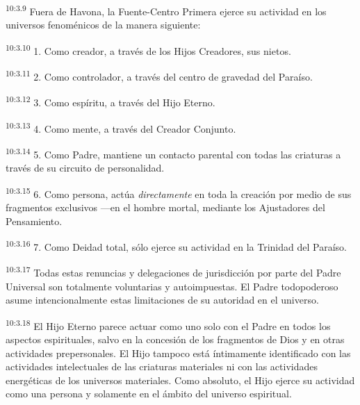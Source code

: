 \par
\textsuperscript{10:3.9} Fuera de Havona, la Fuente-Centro Primera ejerce su actividad en los universos fenoménicos de la manera siguiente:

\par
\textsuperscript{10:3.10} 1. Como creador, a través de los Hijos Creadores, sus nietos.

\par
\textsuperscript{10:3.11} 2. Como controlador, a través del centro de gravedad del Paraíso.

\par
\textsuperscript{10:3.12} 3. Como espíritu, a través del Hijo Eterno.

\par
\textsuperscript{10:3.13} 4. Como mente, a través del Creador Conjunto.

\par
\textsuperscript{10:3.14} 5. Como Padre, mantiene un contacto parental con todas las criaturas a través de su circuito de personalidad.

\par
\textsuperscript{10:3.15} 6. Como persona, actúa \textit{directamente} en toda la creación por medio de sus fragmentos exclusivos ---en el hombre mortal, mediante los Ajustadores del Pensamiento.

\par
\textsuperscript{10:3.16} 7. Como Deidad total, sólo ejerce su actividad en la Trinidad del Paraíso.

\par
\textsuperscript{10:3.17} Todas estas renuncias y delegaciones de jurisdicción por parte del Padre Universal son totalmente voluntarias y autoimpuestas. El Padre todopoderoso asume intencionalmente estas limitaciones de su autoridad en el universo.

\par
\textsuperscript{10:3.18} El Hijo Eterno parece actuar como uno solo con el Padre en todos los aspectos espirituales, salvo en la concesión de los fragmentos de Dios y en otras actividades prepersonales. El Hijo tampoco está íntimamente identificado con las actividades intelectuales de las criaturas materiales ni con las actividades energéticas de los universos materiales. Como absoluto, el Hijo ejerce su actividad como una persona y solamente en el ámbito del universo espiritual.

